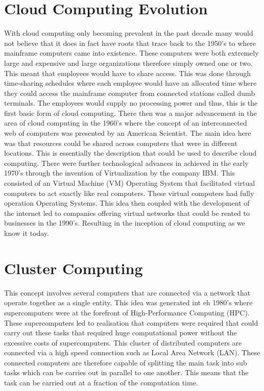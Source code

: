 \documentclass[oneside,12pt]{Classes/RoboticsLaTeX}
\begin{document}
\section{Cloud Computing Evolution}
With cloud computing only becoming prevalent in the past decade many would not believe that it does in fact have roots that trace back to the 1950's to where mainframe computers came into existence. These computers were both extremely large and expensive and large organizations therefore simply owned one or two. This meant that employees would have to share access. This was done through time-sharing schedules where each employee would have an allocated time where they could access the mainframe computer from connected stations called dumb terminals. The employees would supply no processing power and thus, this is the first basic form of cloud computing. There then was a major advancement in the area of cloud computing in the 1960's where the concept of an interconnected web of computers was presented by an American Scientist. The main idea here was that resources could be shared across  
computers that were in different locations. This is essentially the description that could be used to describe cloud computing. There were further technological advances in achieved in the early 1970's through the invention of Virtualization by the company IBM. This consisted of an Virtual Machine (VM) Operating System that facilitated virtual computers to act exactly like real computers. These virtual computers had fully operation Operating Systems. This idea then coupled with the development of the internet led to companies offering virtual networks that could be rented to businesses in the 1990's. Resulting in the inception of cloud computing as we know it today. 

\section{Cluster Computing}
This concept involves several computers that are connected via a network that operate together as a single entity. This idea was generated int eh 1980's where supercomputers were at the forefront of High-Performance Computing (HPC). These supercomputers led to realisation that computers were required that could carry out these tasks that required huge computational power without the excessive costs of supercomputers. This cluster of distributed computers are connected via a high speed connection such as Local Area Network (LAN). These connected computers are therefore capable of splitting the main task into sub tasks which can be carries out in parallel to one another. This means that the task can be carried out at a fraction of the computation time.
\end{document}
